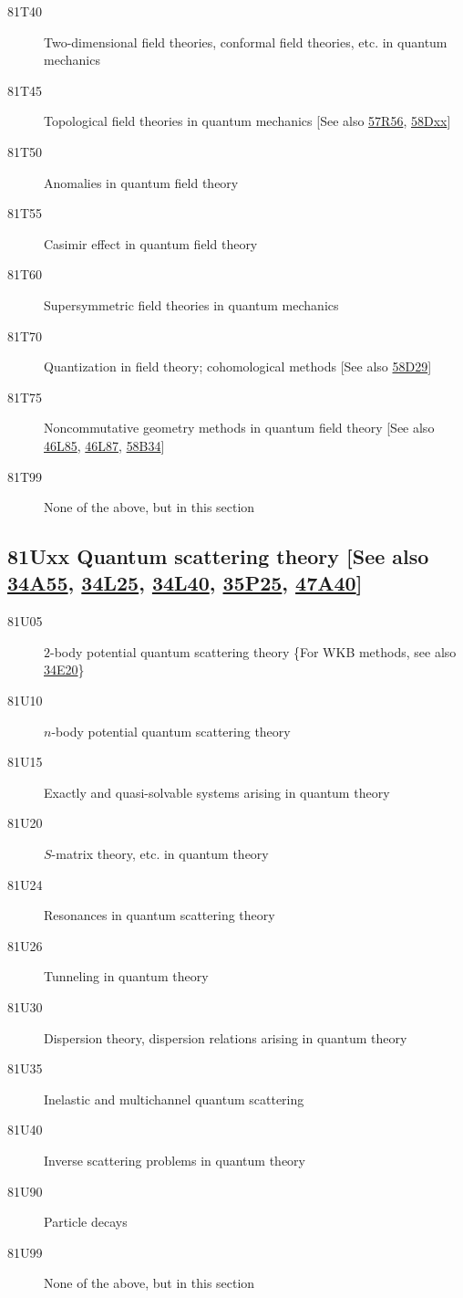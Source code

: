 \begin{description}
\item [81T40]\label{81T40} Two-dimensional field theories, conformal field theories, etc. in quantum mechanics
\item [81T45]\label{81T45} Topological field theories in quantum mechanics [See also \hyperref[57R56]{57R56}, \hyperref[58Dxx]{58Dxx}]
\item [81T50]\label{81T50} Anomalies in quantum field theory
\item [81T55]\label{81T55} Casimir effect in quantum field theory
\item [81T60]\label{81T60} Supersymmetric field theories in quantum mechanics
\item [81T70]\label{81T70} Quantization in field theory; cohomological methods [See also \hyperref[58D29]{58D29}]
\item [81T75]\label{81T75} Noncommutative geometry methods in quantum field theory [See also \hyperref[46L85]{46L85}, \hyperref[46L87]{46L87}, \hyperref[58B34]{58B34}]
\item [81T99]\label{81T99} None of the above, but in this section
\end{description}
\subsection*{81Uxx  Quantum scattering theory [See also \hyperref[34A55]{34A55}, \hyperref[34L25]{34L25}, \hyperref[34L40]{34L40}, \hyperref[35P25]{35P25}, \hyperref[47A40]{47A40}] }\label{81Uxx}
\begin{description}  
\item [81U05]\label{81U05} $2$-body potential quantum scattering theory \{For WKB methods, see also \hyperref[34E20]{34E20}\}
\item [81U10]\label{81U10} $n$-body potential quantum scattering theory
\item [81U15]\label{81U15} Exactly and quasi-solvable systems arising in quantum theory
\item [81U20]\label{81U20} $S$-matrix theory, etc. in quantum theory
\item [81U24]\label{81U24} Resonances in quantum scattering theory
\item [81U26]\label{81U26} Tunneling in quantum theory
\item [81U30]\label{81U30} Dispersion theory, dispersion relations arising in quantum theory
\item [81U35]\label{81U35} Inelastic and multichannel quantum scattering
\item [81U40]\label{81U40} Inverse scattering problems in quantum theory
\item [81U90]\label{81U90} Particle decays
\item [81U99]\label{81U99} None of the above, but in this section
\end{description}
